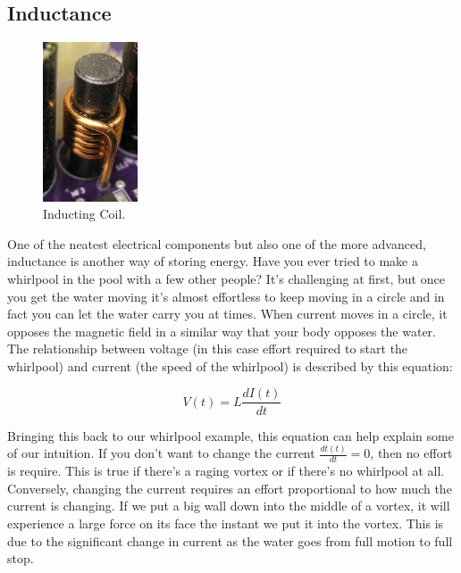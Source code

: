 \documentclass[a4paper]{article}
\begin{document}
\subsection{Inductance}
\begin{figure}
  \begin{center}
    \includegraphics[width=0.25\textwidth]{inductor.jpg}
  \end{center}
  \caption{\label{fig:data}Inducting Coil.}
\end{figure}

One of the neatest electrical components but also one of the more advanced, inductance is another way of storing energy. Have you ever tried to make a whirlpool in the pool with a few other people? It's challenging at first, but once you get the water moving it's almost effortless to keep moving in a circle and in fact you can let the water carry you at times. When current moves in a circle, it opposes the magnetic field in a similar way that your body opposes the water. The relationship between voltage (in this case effort required to start the whirlpool) and current (the speed of the whirlpool) is described by this equation:

\begin{equation} \label{eq:inductance}
V(t) = L\frac{dI(t)}{dt}
\end{equation}
\vspace{0.2cm}

Bringing this back to our whirlpool example, this equation can help explain some of our intuition. If you don't want to change the current {$\frac{dt(t)}{dt} = 0$}, then no effort is require. This is true if there's a raging vortex or if there's no whirlpool at all. Conversely, changing the current requires an effort proportional to how much the current is changing. If we put a big wall down into the middle of a vortex, it will experience a large force on its face the instant we put it into the vortex. This is due to the significant change in current as the water goes from full motion to full stop.
\newpage
\end{document}
